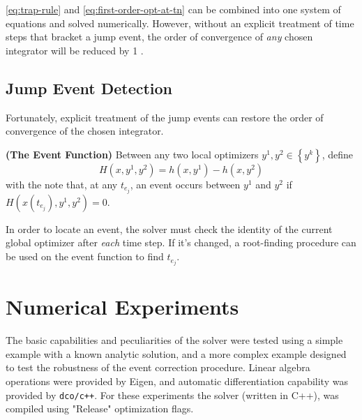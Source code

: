 \documentclass[twoside,leqno,twocolumn]{article}
\begin{document}
\eqref{eq:trap-rule} and \eqref{eq:first-order-opt-at-tn} can be combined into one system of equations and solved numerically. However, without an explicit treatment of time steps that bracket a jump event, the order of convergence of \textit{any} chosen integrator will be reduced by 1 \cite{mannshardtOnestepMethodsAny1978}.

\subsection{Jump Event Detection}

Fortunately, explicit treatment of the jump events can restore the order of convergence of the chosen integrator.
\begin{Definition}
	\label{def:event-fn}
	\textbf{(The Event Function)}
	Between any two local optimizers $y^1, y^2 \in \left\{y^k\right\}$, define
	\begin{equation*}
		H(x, y^1, y^2) = h(x, y^1) - h(x, y^2)
	\end{equation*}
	with the note that, at any $t_{e_j}$, an event occurs between $y^1$ and $y^2$ if $H\left(x(t_{e_j}), y^1, y^2\right) = 0$.
\end{Definition}
In order to locate an event, the solver must check the identity of the current global optimizer after \textit{each} time step. If it's changed, a root-finding procedure can be used on the event function to find $t_{e_j}$.


\section{Numerical Experiments}
The basic capabilities and peculiarities of the solver were tested using a simple example with a known analytic solution, and a more complex example designed to test the robustness of the event correction procedure. Linear algebra operations were provided by Eigen\cite{guennebaudEigenV32010}, and automatic differentiation capability was provided by \texttt{dco/c++}\cite{leppkesDerivativeCodeOverloading2016}. For these experiments the solver (written in C++), was compiled using "Release" optimization flags.

\end{document}
